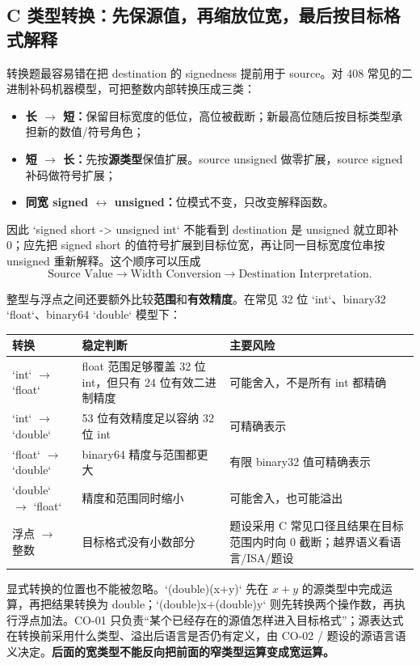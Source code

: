 \documentclass[UTF8,fontset=fandol,11pt,a4paper]{ctexart}
\newcommand{\kw}[1]{\textbf{\color{deep}#1}}
\begin{document}
\subsection{C 类型转换：先保源值，再缩放位宽，最后按目标格式解释}

转换题最容易错在把 destination 的 signedness 提前用于 source。对 408 常见的二进制补码机器模型，可把整数内部转换压成三类：
\begin{itemize}
  \item \kw{长 $\to$ 短：}保留目标宽度的低位，高位被截断；新最高位随后按目标类型承担新的数值/符号角色；
  \item \kw{短 $\to$ 长：}先按\textbf{源类型}保值扩展。source unsigned 做零扩展，source signed 补码做符号扩展；
  \item \kw{同宽 signed $\leftrightarrow$ unsigned：}位模式不变，只改变解释函数。
\end{itemize}
因此 `signed short -> unsigned int` 不能看到 destination 是 unsigned 就立即补 0；应先把 signed short 的值符号扩展到目标位宽，再让同一目标宽度位串按 unsigned 重新解释。这个顺序可以压成
\[
\boxed{\text{Source Value}\to\text{Width Conversion}\to\text{Destination Interpretation}}.
\]

整型与浮点之间还要额外比较\textbf{范围}和\textbf{有效精度}。在常见 32 位 `int`、binary32 `float`、binary64 `double` 模型下：
\begin{center}\small
\begin{tabularx}{\linewidth}{L{2.4cm}YY}
\toprule
转换 & 稳定判断 & 主要风险 \\
\midrule
`int` $\to$ `float` & float 范围足够覆盖 32 位 int，但只有 24 位有效二进制精度 & 可能舍入，不是所有 int 都精确 \\
`int` $\to$ `double` & 53 位有效精度足以容纳 32 位 int & 可精确表示 \\
`float` $\to$ `double` & binary64 精度与范围都更大 & 有限 binary32 值可精确表示 \\
`double` $\to$ `float` & 精度和范围同时缩小 & 可能舍入，也可能溢出 \\
浮点 $\to$ 整数 & 目标格式没有小数部分 & 题设采用 C 常见口径且结果在目标范围内时向 0 截断；越界语义看语言/ISA/题设 \\
\bottomrule
\end{tabularx}
\end{center}

显式转换的位置也不能被忽略。`(double)(x+y)` 先在 $x+y$ 的源类型中完成运算，再把结果转换为 double；`(double)x+(double)y` 则先转换两个操作数，再执行浮点加法。CO-01 只负责“某个已经存在的源值怎样进入目标格式”；源表达式在转换前采用什么类型、溢出后语言是否仍有定义，由 CO-02 / 题设的源语言语义决定。\kw{后面的宽类型不能反向把前面的窄类型运算变成宽运算。}
\end{document}
